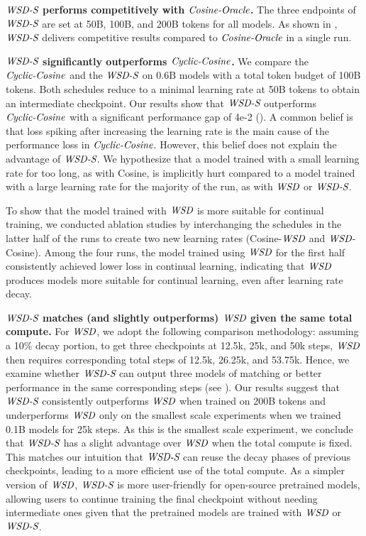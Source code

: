 \textbf{$\textit{WSD-S}$ performs competitively with $\textit{Cosine-Oracle}$.} The three endpoints of $\textit{WSD-S}$ are set at 50B, 100B, and 200B tokens for all models. As shown in , $\textit{WSD-S}$ delivers competitive results compared to $\textit{Cosine-Oracle}$ in a single run.

\textbf{$\textit{WSD-S}$ significantly outperforms $\textit{Cyclic-Cosine}$.} 
We compare the $\textit{Cyclic-Cosine}$ and the $\textit{WSD-S}$ on 0.6B models with a total token budget of 100B tokens. Both schedules reduce to a minimal learning rate at 50B tokens to obtain an intermediate checkpoint. Our results show that $\textit{WSD-S}$ outperforms $\textit{Cyclic-Cosine}$ with a significant performance gap of 4e-2 (). A common belief is that loss spiking after increasing the learning rate is the main cause of the performance loss in $\textit{Cyclic-Cosine}$. However, this belief does not explain the advantage of $\textit{WSD-S}$. We hypothesize that a model trained with a small learning rate for too long, as with Cosine, is implicitly hurt compared to a model trained with a large learning rate for the majority of the run, as with $\textit{WSD}$ or $\textit{WSD-S}$. 

To show that the model trained with $\textit{WSD}$ is more suitable for continual training, we conducted ablation studies by interchanging the schedules in the latter half of the runs to create two new learning rates (Cosine-$\textit{WSD}$ and $\textit{WSD}$-Cosine). Among the four runs, the model trained using $\textit{WSD}$ for the first half consistently achieved lower loss in continual learning, indicating that $\textit{WSD}$ produces models more suitable for continual learning, even after learning rate decay.


\textbf{$\textit{WSD-S}$ matches (and slightly outperforms) $\textit{WSD}$ given the same total compute.} For $\textit{WSD}$, we adopt the following comparison methodology: assuming a 10$\%$ decay portion, to get three checkpoints at 12.5k, 25k, and 50k steps, $\textit{WSD}$ then requires corresponding total steps of 12.5k, 26.25k, and 53.75k.  Hence, we examine whether $\textit{WSD-S}$ can output three models of matching or better performance in the same corresponding steps (see ). Our results suggest that $\textit{WSD-S}$ consistently outperforms $\textit{WSD}$ when trained on 200B tokens and underperforms $\textit{WSD}$ only on the smallest scale experiments when we trained 0.1B models for 25k steps. As this is the smallest scale experiment, we conclude that $\textit{WSD-S}$ has a slight advantage over $\textit{WSD}$ when the total compute is fixed. This matches our intuition that $\textit{WSD-S}$ can reuse the decay phases of previous checkpoints, leading to a more efficient use of the total compute. As a simpler version of $\textit{WSD}$, $\textit{WSD-S}$ is more user-friendly for open-source pretrained models, allowing users to continue training the final checkpoint without needing intermediate ones given that the pretrained models are trained with $\textit{WSD}$ or $\textit{WSD-S}$.

